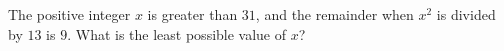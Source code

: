 The positive integer $x$ is greater than $31$, and the remainder when $x^2$ is divided by $13$ is $9$. What is the least possible value of $x$?
